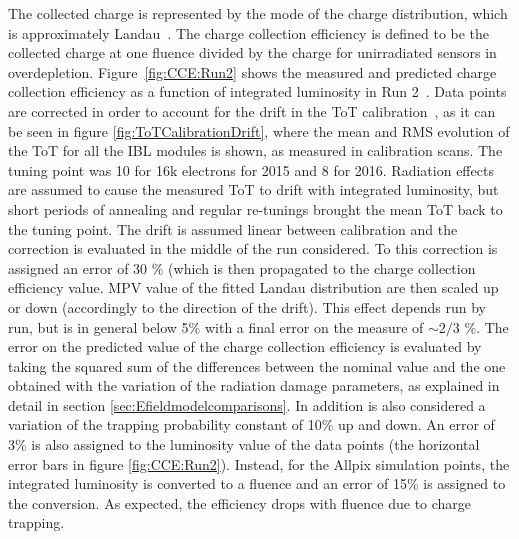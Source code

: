 The collected charge is represented by the mode of the charge distribution, which is approximately Landau~\cite{Landau:1944if}.  The charge collection efficiency is defined to be the collected charge at one fluence divided by the charge for unirradiated sensors in overdepletion.  Figure~\ref{fig:CCE:Run2} shows the measured and predicted charge collection efficiency as a function of integrated luminosity in Run 2~\cite{Rossini:2273193}. Data points are corrected in order to account for the drift in the ToT calibration~\cite{Miucci:2129027,Higashino:2252674}, as it can be seen in figure \ref{fig:ToTCalibrationDrift}, where the mean and RMS evolution of the ToT for all the IBL modules is shown, as measured in calibration scans. The tuning point was 10  for 16k electrons for 2015 and 8 for 2016. Radiation effects are assumed to cause the measured ToT to drift  with integrated luminosity, but short periods of annealing and regular re-tunings brought the mean ToT back to the tuning point. The drift is assumed linear between calibration and the correction is evaluated in the middle of the run considered. To this correction is assigned an error of 30 \% (which is then propagated to the charge collection efficiency value. MPV value of the fitted Landau distribution are then scaled up or down (accordingly to the direction of the drift). This effect depends run by run, but is in general below 5\% with a final error on the measure of $\sim 2/3 $ \%. The error on the predicted value of the charge collection efficiency is evaluated by taking the squared sum of the differences between the nominal value and the one obtained with the variation of the radiation damage parameters, as explained in detail in section \ref{sec:Efieldmodelcomparisons}. In addition is also considered a variation of the trapping probability constant of 10\% up and down. An error of 3\% is also assigned to the luminosity value of the data points (the horizontal error bars in figure \ref{fig:CCE:Run2}). Instead, for the Allpix simulation points, the integrated luminosity is converted to a fluence 
and an error of 15\% is assigned to the conversion. As expected, the efficiency drops with fluence due to charge trapping.  
